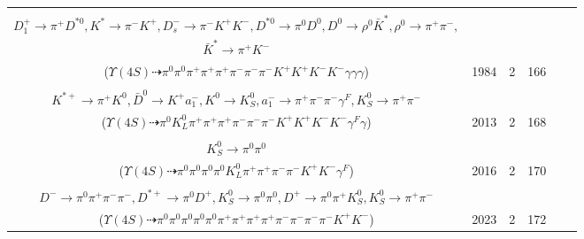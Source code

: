 \documentclass[landscape]{article}
\newcounter{rownumbers}
\newcommand\rn{\stepcounter{rownumbers}\arabic{rownumbers}}
\newcommand{\EOLP}{\\ \hline} %
\newcommand{\topoTags}[1]{#1} %
\begin{document}
\begin{longtable}{clcccc}
\rn & \makecell[l]{ $ 
\Upsilon(4S) \rightarrow B^{0} \bar{B}^{0} ,
B^{0} \rightarrow \eta K_2^{*0} ,
\bar{B}^{0} \rightarrow D_{s}^{*-} D_{1}^{+} ,
\eta \rightarrow \gamma \gamma ,
K_2^{*0} \rightarrow \pi^{0} K^{*} ,
D_{s}^{*-} \rightarrow D_{s}^{-} \gamma ,
$ \\ $
D_{1}^{+} \rightarrow \pi^{+} D^{*0} ,
K^{*} \rightarrow \pi^{-} K^{+} ,
D_{s}^{-} \rightarrow \pi^{-} K^{+} K^{-} ,
D^{*0} \rightarrow \pi^{0} D^{0} ,
D^{0} \rightarrow \rho^{0} \bar{K}^{*} ,
\rho^{0} \rightarrow \pi^{+} \pi^{-} ,
$ \\ $
\bar{K}^{*} \rightarrow \pi^{+} K^{-} 
$ \\ ($
\Upsilon(4S) \dashrightarrow \pi^{0} \pi^{0} \pi^{+} \pi^{+} \pi^{+} \pi^{-} \pi^{-} \pi^{-} K^{+} K^{+} K^{-} K^{-} \gamma \gamma \gamma 
$) } & \topoTags{1984 & }2 & 166 \EOLP

\rn & \makecell[l]{ $ 
\Upsilon(4S) \rightarrow B^{0} \bar{B}^{0} ,
B^{0} \rightarrow K^{-} K^{*}(1680)^{+} ,
\bar{B}^{0} \rightarrow K^{-} D^{+} \bar{D}^{*0} ,
K^{*}(1680)^{+} \rightarrow \pi^{0} K^{+} ,
D^{+} \rightarrow K_{L}^{0} K^{*+} ,
\bar{D}^{*0} \rightarrow \bar{D}^{0} \gamma ,
$ \\ $
K^{*+} \rightarrow \pi^{+} K^{0} ,
\bar{D}^{0} \rightarrow K^{+} a_{1}^{-} ,
K^{0} \rightarrow K_{S}^{0} ,
a_{1}^{-} \rightarrow \pi^{+} \pi^{-} \pi^{-} \gamma^{F} ,
K_{S}^{0} \rightarrow \pi^{+} \pi^{-} 
$ \\ ($
\Upsilon(4S) \dashrightarrow \pi^{0} K_{L}^{0} \pi^{+} \pi^{+} \pi^{+} \pi^{-} \pi^{-} \pi^{-} K^{+} K^{+} K^{-} K^{-} \gamma^{F} \gamma 
$) } & \topoTags{2013 & }2 & 168 \EOLP

\rn & \makecell[l]{ $ 
\Upsilon(4S) \rightarrow B^{0} \bar{B}^{0} ,
B^{0} \rightarrow K^{0} K^{+} K^{-} ,
\bar{B}^{0} \rightarrow \pi^{0} \rho^{0} \pi^{-} D^{+} ,
K^{0} \rightarrow K_{S}^{0} ,
\rho^{0} \rightarrow \pi^{+} \pi^{-} \gamma^{F} ,
D^{+} \rightarrow \pi^{0} K_{L}^{0} \pi^{+} ,
$ \\ $
K_{S}^{0} \rightarrow \pi^{0} \pi^{0} 
$ \\ ($
\Upsilon(4S) \dashrightarrow \pi^{0} \pi^{0} \pi^{0} \pi^{0} K_{L}^{0} \pi^{+} \pi^{+} \pi^{-} \pi^{-} K^{+} K^{-} \gamma^{F} 
$) } & \topoTags{2016 & }2 & 170 \EOLP

\rn & \makecell[l]{ $ 
\Upsilon(4S) \rightarrow B^{0} B^{0} ,
B^{0} \rightarrow K^{*} \bar{K}^{*} ,
B^{0} \rightarrow K^{0} D^{-} D^{*+} ,
K^{*} \rightarrow \pi^{-} K^{+} ,
\bar{K}^{*} \rightarrow \pi^{+} K^{-} ,
K^{0} \rightarrow K_{S}^{0} ,
$ \\ $
D^{-} \rightarrow \pi^{0} \pi^{+} \pi^{-} \pi^{-} ,
D^{*+} \rightarrow \pi^{0} D^{+} ,
K_{S}^{0} \rightarrow \pi^{0} \pi^{0} ,
D^{+} \rightarrow \pi^{0} \pi^{+} K_{S}^{0} ,
K_{S}^{0} \rightarrow \pi^{+} \pi^{-} 
$ \\ ($
\Upsilon(4S) \dashrightarrow \pi^{0} \pi^{0} \pi^{0} \pi^{0} \pi^{0} \pi^{+} \pi^{+} \pi^{+} \pi^{+} \pi^{-} \pi^{-} \pi^{-} \pi^{-} K^{+} K^{-} 
$) } & \topoTags{2023 & }2 & 172 \EOLP


\end{longtable}
\end{document}
